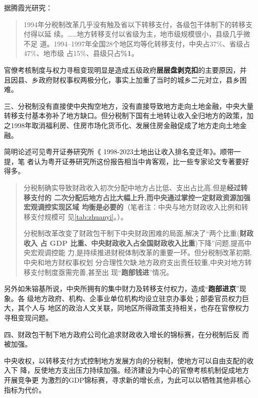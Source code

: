 据腾霞光研究：
\begin{quotation}
  1994年分税制改革几乎没有触及省以下转移支付，各级包干体制下的转移支付得以延
  续。……地方转移支付以省级为主，地市级规模很小，县级几乎微不足
  道。1994--1997年全国28个地区均等化转移支付，中央占37\%、省级占47\%、地市级
  占15\%、县级只占\textbf{\%1}。
\end{quotation}

官僚考核制度与权力寻租变现明显是造成五级政府\textbf{层层盘剥克扣}的主要原因，并
且因县、乡政府财权事权两极分化，事实上加重了当时的城乡二元对立，县乡困难。


{\heiti 三、分税制没有直接使中央掏空地方，没有直接导致地方走向土地金融，中央大量
  转移支付基本弥补了地方缺口。但分税制下国有土地转让收入全归地方的政策，加
  之1998年取消福利房、住房市场化货币化、发展住房金融促成了地方走向土地金融。}

简明论述可见粤开证券研究所《 1998-2023土地出让收入排名变迁年》。顺带一提，笔
者认为粤开证券研究所这份报告相当中肯客观，比一些专家论文专著要好得多。
\begin{quotation}
  分税制确实导致财政收入初次分配中地方占比低、支出占比高,但是\textbf{经过转移支付的
    二次分配后地方占比大幅上升,而中央通过掌控一定财政资源加强宏观调控实现区域
    均衡是必要的}（笔者注：中央与地方财政收入比例和转移支付规模可
  见\cref{tab:zhuanyi}。）。

  分税制改革改变了财政包干制下中央财政困难的局面,解决了“两个比重(\textbf{财政收入
  占 GDP 比重、中央财政收入占全国财政收入比重})下降”问题,提高中央宏观调控能
  力,是持续推进财税体制改革的重要一环。但分税制改革初期,中央和地方财权事权划
  分合理性欠缺,地方政府支出责任较重,中央对地方转移支付制度亟需完善,甚至出
  现“\textbf{跑部钱进}”情况。
\end{quotation}

另外如朱镕基所说，中央所拥有的集中财力及转移支付权力，造成“\textbf{跑部进京}”现象。各
级地方政府、机构、企事业单位机构均设立驻京办事处；部委官员权力巨大，其个人与
地区的政治人文关联，同地区所得政策支持相关，也存在官僚权力寻租变现问题。


{\heiti 四、财政包干制下地方政府公司化追求财政收入增长的锦标赛，在分税制后反
  而被加强\cite{yangdi}。}

中央收权，以转移支付方式控制地方发展方向的分税制，使地方可以自由支配的收入下
降，反使地方支出压力持续加强。经济建设为中心的官僚考核机制促成地方开展竞争更
为激烈的GDP锦标赛，寻求新的增长点，为此可以以牺牲其他非核心指标为代价。


